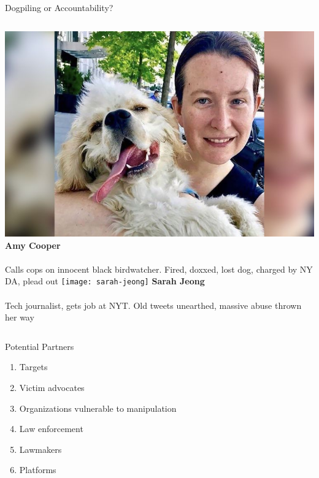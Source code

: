 \documentclass[nobackground,dvipsnames,table]{beamer}
\begin{document}
\begin{frame}{Dogpiling or Accountability?}
\begin{columns}[T]
            \includegraphics[trim=220 0 140 0, clip, height=0.3\textheight]{amy-cooper}
            \textbf{Amy Cooper}\\~\\
            Calls cops on innocent black birdwatcher. Fired, doxxed, lost dog, charged by NY DA, plead out
            \texttt{[image: sarah-jeong]}
            \textbf{Sarah Jeong}\\~\\
            Tech journalist, gets job at NYT. Old tweets unearthed, massive abuse thrown her way
    \end{columns}
\end{frame}

\begin{frame}{Potential Partners}
    \begin{enumerate}
        \item Targets
        \item Victim advocates
        \item Organizations vulnerable to manipulation
        \item Law enforcement
        \item Lawmakers
        \item Platforms
    \end{enumerate}
\end{frame}
\end{document}
